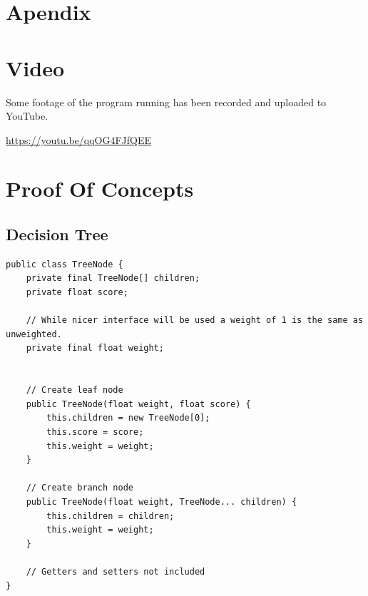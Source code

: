 \documentclass{article}
\begin{document}
\section*{Apendix}
\section{Video}
\label{subsec:vid}
\par{Some footage of the program running has been recorded and uploaded to YouTube.}
\par{\hyperlink{youtu.be/qqOG4FJfQEE}{https://youtu.be/qqOG4FJfQEE}}
\section{Proof Of Concepts}
\subsection{Decision Tree}
\label{subsubsec:apendixdt}
\begin{verbatim}
public class TreeNode {
    private final TreeNode[] children;
    private float score;

    // While nicer interface will be used a weight of 1 is the same as unweighted.
    private final float weight;


    // Create leaf node
    public TreeNode(float weight, float score) {
        this.children = new TreeNode[0];
        this.score = score;
        this.weight = weight;
    }

    // Create branch node
    public TreeNode(float weight, TreeNode... children) {
        this.children = children;
        this.weight = weight;
    }

    // Getters and setters not included
}
\end{verbatim}
\end{document}
